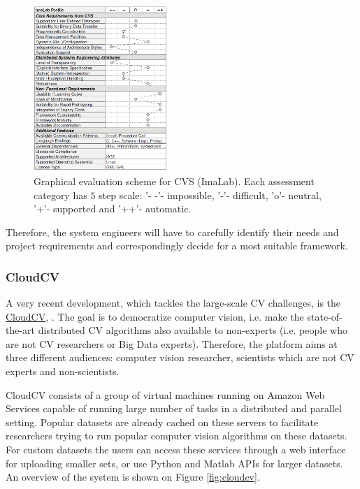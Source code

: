 \begin{figure}[H]
\begin{center}
\includegraphics[width=0.45\textwidth]{fig/CVSEval}
\end{center}
\caption{Graphical evaluation scheme for CVS (ImaLab). Each assessment category has $5$ step scale: '- -'- impossible, '-'- difficult, 'o'- neutral, '+'- supported and '++'- automatic.}
\label{fig:cvseval}
\end{figure}

Therefore, the system engineers will have to carefully identify their needs and project requirements and correspondingly decide for a most suitable framework.

\subsubsection{CloudCV}
A very recent development, which tackles the large-scale CV challenges, is the \href{http://cloudcv.org/}{\underline{CloudCV}}, \cite{AgrawalMGCBMOB15}. The goal is to democratize computer vision, i.e. make the state-of-the-art distributed CV algorithms also available to non-experts (i.e. people who are not CV researchers or Big Data experts). Therefore, the platform aims at three different audiences: computer vision researcher, scientists which are not CV experts and non-scientists. 

CloudCV consists of a group of virtual machines running on Amazon
Web Services capable of running large number of tasks in a distributed and parallel
setting. Popular datasets are already cached on these servers to facilitate researchers
trying to run popular computer vision algorithms on these datasets. For custom datasets the users
can access these services through a web interface for uploading smaller sets, or use Python and Matlab APIs for larger datasets. An overview of the system is shown on Figure \ref{fig:cloudcv}.

